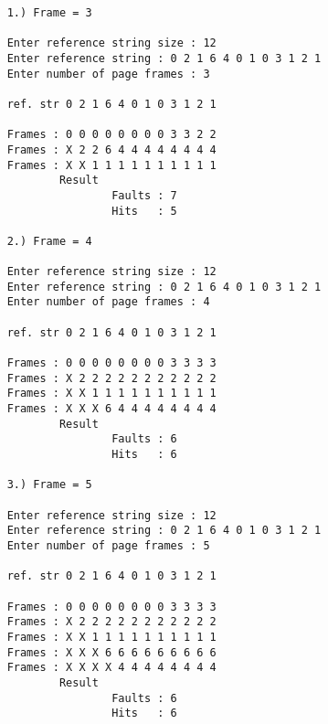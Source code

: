 \documentclass{article}
\begin{document}
\begin{enumerate}
{\begin{verbatim}
    1.) Frame = 3

    Enter reference string size : 12
    Enter reference string : 0 2 1 6 4 0 1 0 3 1 2 1
    Enter number of page frames : 3
    
    ref. str 0 2 1 6 4 0 1 0 3 1 2 1
    
    Frames : 0 0 0 0 0 0 0 0 3 3 2 2
    Frames : X 2 2 6 4 4 4 4 4 4 4 4
    Frames : X X 1 1 1 1 1 1 1 1 1 1
            Result
                    Faults : 7
                    Hits   : 5

    2.) Frame = 4

    Enter reference string size : 12
    Enter reference string : 0 2 1 6 4 0 1 0 3 1 2 1
    Enter number of page frames : 4
    
    ref. str 0 2 1 6 4 0 1 0 3 1 2 1
    
    Frames : 0 0 0 0 0 0 0 0 3 3 3 3
    Frames : X 2 2 2 2 2 2 2 2 2 2 2
    Frames : X X 1 1 1 1 1 1 1 1 1 1
    Frames : X X X 6 4 4 4 4 4 4 4 4
            Result
                    Faults : 6
                    Hits   : 6  
    
    3.) Frame = 5

    Enter reference string size : 12
    Enter reference string : 0 2 1 6 4 0 1 0 3 1 2 1
    Enter number of page frames : 5
    
    ref. str 0 2 1 6 4 0 1 0 3 1 2 1
    
    Frames : 0 0 0 0 0 0 0 0 3 3 3 3 
    Frames : X 2 2 2 2 2 2 2 2 2 2 2
    Frames : X X 1 1 1 1 1 1 1 1 1 1
    Frames : X X X 6 6 6 6 6 6 6 6 6
    Frames : X X X X 4 4 4 4 4 4 4 4
            Result
                    Faults : 6
                    Hits   : 6  

\end{verbatim}
}

\end{enumerate}
\end{document}
